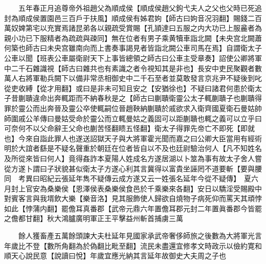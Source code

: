 　　五年春正月追尊帝外祖趙父為順成侯【順成侯趙父鉤弋夫人之父也父時已死追封為順成侯置園邑三百戶于扶風】順成侯有姊君姁【師古曰姁音况羽翻】賜錢二百萬奴婢第宅以充實焉諸昆弟各以親疏受賞賜【孔頴達曰五服之内大功已上服麄者為親小功已下服精者為疏疏與疎同】無在位者有男子乘黄犢車詣北闕【未央宫北闕蕭何築也師古曰未央宫雖南向而上書奏事謁見者皆詣北闕公車司馬在焉】自謂衛太子公車以聞【班表公車屬衛尉天下上事皆總領之師古曰公車主受章奏】詔使公卿將軍中二千石雜識視【師古曰雜共也有素識之者令視知其是非也】長安中吏民聚觀者數萬人右將軍勒兵闕下以備非常丞相御史中二千石至者並莫敢發言京兆尹不疑後到叱從吏收縛【從才用翻】或曰是非未可知且安之【安猶徐也】不疑曰諸君何患於衛太子昔蒯聵違命出奔輒距而不納春秋是之【師古曰蒯聵衛靈公太子輒蒯聵子也蒯聵得罪於靈公而出奔晉及靈公卒使輒嗣位晉趙鞅納蒯聵於戚欲求入衛齊國夏衛石曼姑帥師圍戚公羊傳曰曼姑受命於靈公而立輒曼姑之義固可以距蒯聵也輒之義可以立乎曰可奈何不以父命辭王父命也蒯苦怪翻瞆五怪翻】衛太子得罪先帝亡不即死【即就也】今來自詣此罪人也遂送詔獄天子與大將軍霍光聞而嘉之曰公卿大臣當用有經術明於大誼者繇是不疑名聲重於朝廷在位者皆自以不及也廷尉驗治何人【凡不知姓名及所從來皆曰何人】竟得姦詐本夏陽人姓成名方遂居湖以卜筮為事有故太子舍人嘗從方遂卜謂曰子狀貌甚似衛太子方遂心利其言冀得以富貴坐誣罔不道要斬【要與腰同　考異曰昭紀云張延年雋不疑傳云成方遂又云一姓張名延年今從不疑傳】　夏六月封上官安為桑樂侯【恩澤侯表桑樂侯食邑於千乘樂來各翻】安日以驕淫受賜殿中對賓客言與我壻飲大樂【樂音洛】見其服飾使人歸欲自燒物子病死仰而罵天其頑悖如此【悖蒲内翻】罷儋耳真番郡【武帝元鼎六年置儋耳郡元封二年置眞番郡今皆罷之儋都甘翻】秋大鴻臚廣明軍正王平擊益州斬首捕虜三萬

　　餘人獲畜產五萬餘頭諫大夫杜延年見國家承武帝奢侈師旅之後數為大將軍光言年歲比不登【數所角翻為於偽翻比毗至翻】流民未盡還宜修孝文時政示以儉約寛和順天心說民意【說讀曰悅】年歲宜應光納其言延年故御史大夫周之子也

